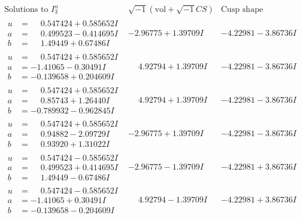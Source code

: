 \documentclass[1p]{elsarticle_modified}
\theoremstyle{definition}
\newcommand{\I}{\sqrt{-1}}
\begin{document}
$$\begin{array}{c|c|c}  
\text{Solutions to }I^u_{3}& \I (\text{vol} + \sqrt{-1}CS) & \text{Cusp shape}\\
 \hline 
\begin{aligned}
u &= \phantom{-}0.547424 + 0.585652 I \\
a &= \phantom{-}0.499523 - 0.414695 I \\
b &= \phantom{-}1.49449 + 0.67486 I\end{aligned}
 & -2.96775 + 1.39709 I & -4.22981 - 3.86736 I \\ \hline\begin{aligned}
u &= \phantom{-}0.547424 + 0.585652 I \\
a &= -1.41065 - 0.30491 I \\
b &= -0.139658 + 0.204609 I\end{aligned}
 & \phantom{-}4.92794 + 1.39709 I & -4.22981 - 3.86736 I \\ \hline\begin{aligned}
u &= \phantom{-}0.547424 + 0.585652 I \\
a &= \phantom{-}0.85743 + 1.26440 I \\
b &= -0.789932 - 0.962845 I\end{aligned}
 & \phantom{-}4.92794 + 1.39709 I & -4.22981 - 3.86736 I \\ \hline\begin{aligned}
u &= \phantom{-}0.547424 + 0.585652 I \\
a &= \phantom{-}0.94882 - 2.09729 I \\
b &= \phantom{-}0.93920 + 1.31022 I\end{aligned}
 & -2.96775 + 1.39709 I & -4.22981 - 3.86736 I \\ \hline\begin{aligned}
u &= \phantom{-}0.547424 - 0.585652 I \\
a &= \phantom{-}0.499523 + 0.414695 I \\
b &= \phantom{-}1.49449 - 0.67486 I\end{aligned}
 & -2.96775 - 1.39709 I & -4.22981 + 3.86736 I \\ \hline\begin{aligned}
u &= \phantom{-}0.547424 - 0.585652 I \\
a &= -1.41065 + 0.30491 I \\
b &= -0.139658 - 0.204609 I\end{aligned}
 & \phantom{-}4.92794 - 1.39709 I & -4.22981 + 3.86736 I \\ \hline\begin{aligned}

\end{aligned}
\end{array}$$
\end{document}
